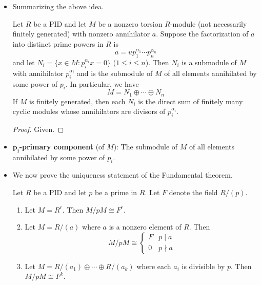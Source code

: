 \documentclass[../notes.tex]{subfiles}
\begin{document}
\begin{itemize}
    \item Summarizing the above idea.
    \begin{theorem}\label{trm:12.7}
        Let $R$ be a PID and let $M$ be a nonzero torsion $R$-module (not necessarily finitely generated) with nonzero annihilator $a$. Suppose the factorization of $a$ into distinct prime powers in $R$ is
        \begin{equation*}
            a = up_1^{\alpha_1}\cdots p_n^{\alpha_n}
        \end{equation*}
        and let $N_i=\{x\in M:p_i^{\alpha_i}x=0\}$ ($1\leq i\leq n$). Then $N_i$ is a submodule of $M$ with annihilator $p_i^{\alpha_i}$ and is the submodule of $M$ of all elements annihilated by some power of $p_i$. In particular, we have
        \begin{equation*}
            M = N_1\oplus\cdots\oplus N_n
        \end{equation*}
        If $M$ is finitely generated, then each $N_i$ is the direct sum of finitely many cyclic modules whose annihilators are divisors of $p_i^{\alpha_i}$.
        \begin{proof}
            Given.
        \end{proof}
    \end{theorem}
    \item \textbf{$\bm{p_i}$-primary component} (of $M$): The submodule of $M$ of all elements annihilated by some power of $p_i$.
    \item We now prove the uniqueness statement of the Fundamental theorem.
    \begin{lemma}\label{lem:12.8}
        Let $R$ be a PID and let $p$ be a prime in $R$. Let $F$ denote the field $R/(p)$.
        \begin{enumerate}[ref={\thelemma(\arabic*)}]
            \item \label{lem:12.8.1}Let $M=R^r$. Then $M/pM\cong F^r$.
            \item \label{lem:12.8.2}Let $M=R/(a)$ where $a$ is a nonzero element of $R$. Then
            \begin{equation*}
                M/pM \cong
                \begin{cases}
                    F & p\mid a\\
                    0 & p\nmid a
                \end{cases}
            \end{equation*}
            \item \label{lem:12.8.3}Let $M=R/(a_1)\oplus\cdots\oplus R/(a_k)$ where each $a_i$ is divisible by $p$. Then $M/pM\cong F^k$.

\end{enumerate}
\end{lemma}
\end{itemize}
\end{document}
